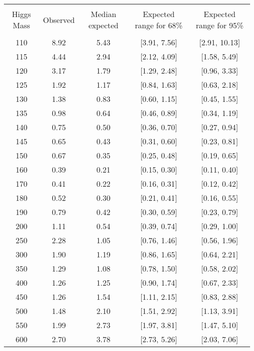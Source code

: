 \begin{table}[hbp!]
\begin{center}
\begin{tabular}{c c c c c}
\hline
\vspace{-3mm} && \\
 Higgs Mass & Observed  & Median expected & Expected range for 68\% & Expected range for 95\%   \\
\vspace{-3mm} && \\
\hline
110 & 8.92 & 5.43 & [3.91, 7.56] & [2.91, 10.13] \\
115 & 4.44 & 2.94 & [2.12, 4.09] & [1.58, 5.49] \\
120 & 3.17 & 1.79 & [1.29, 2.48] & [0.96, 3.33] \\
125 & 1.92 & 1.17 & [0.84, 1.63] & [0.63, 2.18] \\
130 & 1.38 & 0.83 & [0.60, 1.15] & [0.45, 1.55] \\
135 & 0.98 & 0.64 & [0.46, 0.89] & [0.34, 1.19] \\
140 & 0.75 & 0.50 & [0.36, 0.70] & [0.27, 0.94] \\
145 & 0.65 & 0.43 & [0.31, 0.60] & [0.23, 0.81] \\
150 & 0.67 & 0.35 & [0.25, 0.48] & [0.19, 0.65] \\
160 & 0.39 & 0.21 & [0.15, 0.30] & [0.11, 0.40] \\
170 & 0.41 & 0.22 & [0.16, 0.31] & [0.12, 0.42] \\
180 & 0.52 & 0.30 & [0.21, 0.41] & [0.16, 0.55] \\
190 & 0.79 & 0.42 & [0.30, 0.59] & [0.23, 0.79] \\
200 & 1.11 & 0.54 & [0.39, 0.74] & [0.29, 1.00] \\
250 & 2.28 & 1.05 & [0.76, 1.46] & [0.56, 1.96] \\
300 & 1.90 & 1.19 & [0.86, 1.65] & [0.64, 2.21] \\
350 & 1.29 & 1.08 & [0.78, 1.50] & [0.58, 2.02] \\
400 & 1.26 & 1.25 & [0.90, 1.74] & [0.67, 2.33] \\
450 & 1.26 & 1.54 & [1.11, 2.15] & [0.83, 2.88] \\
500 & 1.48 & 2.10 & [1.51, 2.92] & [1.13, 3.91] \\
550 & 1.99 & 2.73 & [1.97, 3.81] & [1.47, 5.10] \\
600 & 2.70 & 3.78 & [2.73, 5.26] & [2.03, 7.06] \\
\hline
\end{tabular}

\end{center}
\end{table}
